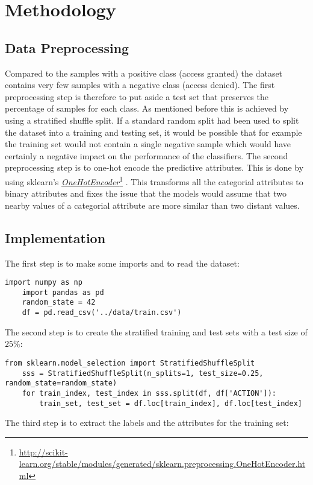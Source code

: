 \documentclass[11pt]{article}
\newcommand\fnurl[2]{%
\href{#2}{#1}\footnote{\url{#2}}%
}
\begin{document}
\section{Methodology}

\subsection{Data Preprocessing}

Compared to the samples with a positive
class (access granted) the dataset contains very few samples with a negative class
(access denied). The first preprocessing step is therefore to put aside a test set 
that preserves the percentage of samples for each class. As mentioned before this is 
achieved by using a stratified shuffle split.
If a standard random split had been used to
split the dataset into a training and testing set, it would be possible that
for example the training set would not contain a single negative sample which
would have certainly a negative impact on the performance of the classifiers.
The second preprocessing step is to one-hot encode the predictive attributes.
This is done by using sklearn's
\fnurl{{\it OneHotEncoder}}{http://scikit-learn.org/stable/modules/generated/sklearn.preprocessing.OneHotEncoder.html}.
This transforms all the categorial attributes to binary attributes and fixes the
issue that the models would assume that two nearby values of a categorial
attribute are more similar than two distant values.

\subsection{Implementation}

The first step is to make some imports and to read the dataset:
\begin{lstlisting}[frame=single]
    import numpy as np
    import pandas as pd
    random_state = 42
    df = pd.read_csv('../data/train.csv')
\end{lstlisting}
\noindent  
The second step is to create the stratified training and test sets with a test size of $25 \%$:

\begin{lstlisting}[frame=single]
    from sklearn.model_selection import StratifiedShuffleSplit
    sss = StratifiedShuffleSplit(n_splits=1, test_size=0.25, random_state=random_state)
    for train_index, test_index in sss.split(df, df['ACTION']):
        train_set, test_set = df.loc[train_index], df.loc[test_index]
\end{lstlisting}
\noindent
The third step is to extract the labels and the attributes for the training set:
\end{document}
